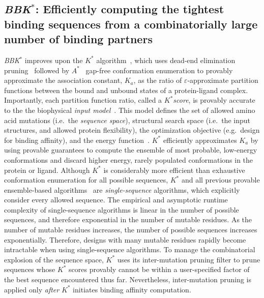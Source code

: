 \def\as{\textit{$A^*$}\xspace}
\def\ks{\textit{$K^*$}\xspace}
\def\ka{\textit{$K_a$}\xspace}
\def\bbks{\textit{BBK$^*$}\xspace}

\subsection{\bbks: Efficiently computing the tightest binding sequences from a combinatorially large number of binding partners}

\bbks improves upon the \ks algorithm~\cite{}, which uses dead-end elimination pruning~\cite{} followed by \as~\cite{} gap-free conformation enumeration to provably approximate the association constant, \ka, as the ratio of $\varepsilon$-approximate partition functions between the bound and unbound states of a protein-ligand complex. Importantly, each partition function ratio, called a \ks \emph{score}, is provably accurate to the the biophysical \emph{input model}~\cite{}. This model defines the set of allowed amino acid mutations (i.e.~the \emph{sequence space}), structural search space (i.e.~the input structures, and allowed protein flexibility), the optimization objective (e.g.~design for binding affinity), and the energy function~\cite{}. \ks efficiently approximates \ka by using provable guarantees to compute the ensemble of most probable, low-energy conformations and discard higher energy, rarely populated conformations in the protein or ligand. Although \ks is considerably more efficient than exhaustive conformation enumeration for all possible sequences, \ks and all previous provable ensemble-based algorithms~\cite{} are \emph{single-sequence} algorithms, which explicitly consider every allowed sequence. The empirical and asymptotic runtime complexity of single-sequence algorithms is linear in the number of possible sequences, and therefore exponential in the number of mutable residues. As the number of mutable residues increases, the number of possible sequences increases exponentially. Therefore, designs with many mutable residues rapidly become intractable when using single-sequence algorithms. To manage the combinatorial explosion of the sequence space, \ks uses its inter-mutation pruning filter to prune sequences whose \ks scores provably cannot be within a user-specified factor of the best sequence encountered thus far. Nevertheless, inter-mutation pruning is applied only \emph{after} \ks initiates binding affinity computation.

~\cite{BBK*}
